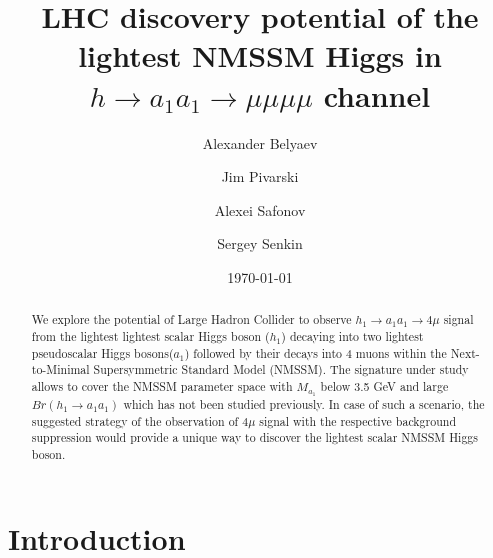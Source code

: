 \documentclass[aps,prl,nofootinbib,superscriptaddress]{revtex4}
\begin{document}


\title
{LHC discovery potential 
of the lightest NMSSM Higgs in $h \to a_1 a_1 \to \mu \mu \mu \mu$
channel}

\author{Alexander Belyaev}
\author{Jim Pivarski}
\author{Alexei Safonov}
\author{Sergey Senkin}


\date{\today}


\begin{abstract}
We explore the potential of Large Hadron Collider to observe  $h_1\to
a_1a_1\to 4\mu$ signal from the lightest lightest scalar Higgs boson
($h_1$) decaying into two  lightest pseudoscalar Higgs bosons($a_1$) 
followed by their decays into 4 muons within the Next-to-Minimal
Supersymmetric Standard Model (NMSSM).
The signature under study allows to cover the  NMSSM parameter space
with  $M_{a_1}$ below 3.5 GeV and large $Br(h_1\to a_1 a_1)$ 
which has not been studied previously. In case of  such a scenario,
the suggested strategy of the observation of 
$4\mu$ signal with the respective background suppression
would provide a unique way to discover
the lightest scalar NMSSM Higgs boson.
\end{abstract}


\maketitle
\section{Introduction}
\end{document}
